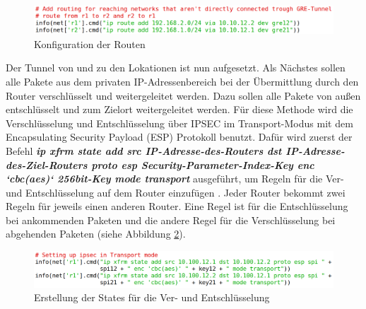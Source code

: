 \documentclass[fontsize=12pt,paper=a4,open=any,parskip=half,
  twoside=false,toc=listof,toc=bibliography,fleqn,leqno,
  captions=nooneline,captions=tableabove,british]{scrbook}
\begin{document}
\begin{figure}[H]
 \centering
 \includegraphics[width=1.0\textwidth]{Bilder/route}
 \captionsetup{justification=centering,margin=2cm}
 \caption{Konfiguration der Routen}
 \label{route}
\end{figure}


Der Tunnel von und zu den Lokationen ist nun aufgesetzt. Als Nächstes sollen alle Pakete aus dem privaten IP-Adressenbereich bei der Übermittlung durch den Router verschlüsselt und weitergeleitet werden. Dazu sollen alle Pakete von außen entschlüsselt und zum Zielort weitergeleitet werden. Für diese Methode wird die Verschlüsselung und Entschlüsselung über IPSEC im Transport-Modus mit dem Encapsulating Security Payload (ESP) Protokoll benutzt. Dafür wird zuerst der Befehl \textit{\textbf{ip xfrm state add src IP-Adresse-des-Routers dst IP-Adresse-des-Ziel-Routers proto esp Security-Parameter-Index-Key enc ‘cbc(aes)‘ 256bit-Key mode transport}} ausgeführt, um Regeln für die Ver- und Entschlüsselung auf dem Router einzufügen \cite{esp}. Jeder Router bekommt zwei Regeln für jeweils einen anderen Router. Eine Regel ist für die Entschlüsselung bei ankommenden Paketen und die andere Regel für die Verschlüsselung bei abgehenden Paketen (siehe Abbildung \ref{state}).

\begin{figure}[H]
 \centering
 \includegraphics[width=1.0\textwidth]{Bilder/state}
 \captionsetup{justification=centering,margin=2cm}
 \caption{Erstellung der States für die Ver- und Entschlüsselung}
 \label{state}
\end{figure}
\end{document}
